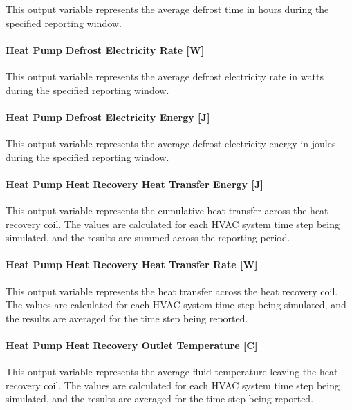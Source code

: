 This output variable represents the average defrost time in hours during the specified reporting window.

\paragraph{Heat Pump Defrost Electricity Rate {[}W{]}}\label{plhp_eir_outputs_defrost_electric_rate}

This output variable represents the average defrost electricity rate in watts during the specified reporting window.

\paragraph{Heat Pump Defrost Electricity Energy {[}J{]}}\label{plhp_eir_outputs_defrost_electric_energy}

This output variable represents the average defrost electricity energy in joules during the specified reporting window.

\paragraph{Heat Pump Heat Recovery Heat Transfer Energy {[}J{]}}\label{air-to-water-heat-pump-heat-recovery-heat-transfer-energy-j}

This output variable represents the cumulative heat transfer across the heat recovery coil. The values are calculated for each HVAC system time step being simulated, and the results are summed across the reporting period.

\paragraph{Heat Pump Heat Recovery Heat Transfer Rate {[}W{]}}\label{air-to-water-heat-pump-heat-recovery-heat-transfer-rate-w}

This output variable represents the heat transfer across the heat recovery coil. The values are calculated for each HVAC system time step being simulated, and the results are averaged for the time step being reported.

\paragraph{Heat Pump Heat Recovery Outlet Temperature {[}C{]}}\label{air-to-water-heat-pump-heat-recovery-outlet-temperature-c}

This output variable represents the average fluid temperature leaving the heat recovery coil. The values are calculated for each HVAC system time step being simulated, and the results are averaged for the time step being reported.

